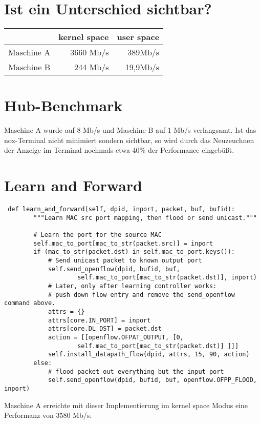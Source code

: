 \documentclass[a4paper,10pt]{scrartcl}
\begin{document}
\section*{Ist ein Unterschied sichtbar?}
  \begin{tabular}{c|rr}
    & kernel space & user space \\ \hline
    Maschine A & 3660 Mb/s & 389Mb/s \\
    Maschine B & 244 Mb/s & 19,9Mb/s \\
  \end{tabular}  
\section*{Hub-Benchmark}
  Maschine A wurde auf 8 Mb/s und Maschine B auf 1 Mb/s verlangsamt. Ist das nox-Terminal nicht minimiert sondern sichtbar, so wird durch das Neuzeuchnen der Anzeige im Terminal nochmals etwa 40\% der Performance eingebüßt. 
\section*{Learn and Forward}
\begin{verbatim}
 def learn_and_forward(self, dpid, inport, packet, buf, bufid):
        """Learn MAC src port mapping, then flood or send unicast."""

        # Learn the port for the source MAC
        self.mac_to_port[mac_to_str(packet.src)] = inport
        if (mac_to_str(packet.dst) in self.mac_to_port.keys()):
            # Send unicast packet to known output port
            self.send_openflow(dpid, bufid, buf, 
                    self.mac_to_port[mac_to_str(packet.dst)], inport)
            # Later, only after learning controller works: 
            # push down flow entry and remove the send_openflow command above.
            attrs = {}
            attrs[core.IN_PORT] = inport
            attrs[core.DL_DST] = packet.dst
            action = [[openflow.OFPAT_OUTPUT, [0, 
                    self.mac_to_port[mac_to_str(packet.dst)] ]]]
            self.install_datapath_flow(dpid, attrs, 15, 90, action)
        else:
            # flood packet out everything but the input port
            self.send_openflow(dpid, bufid, buf, openflow.OFPP_FLOOD, inport)
\end{verbatim}
Maschine A erreichte mit dieser Implementierung im kernel space Modus eine Performanz von 3580 Mb/s.
\end{document}
